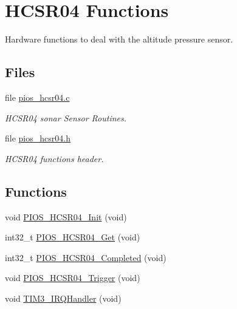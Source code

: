 \hypertarget{group___p_i_o_s___h_c_s_r04}{\section{\-H\-C\-S\-R04 \-Functions}
\label{group___p_i_o_s___h_c_s_r04}
}


\-Hardware functions to deal with the altitude pressure sensor.  


\subsection*{\-Files}
\begin{DoxyCompactItemize}
\item 
file \hyperlink{pios__hcsr04_8c}{pios\-\_\-hcsr04.\-c}
\begin{DoxyCompactList}\small\item\em \-H\-C\-S\-R04 sonar \-Sensor \-Routines. \end{DoxyCompactList}\item 
file \hyperlink{pios__hcsr04_8h}{pios\-\_\-hcsr04.\-h}
\begin{DoxyCompactList}\small\item\em \-H\-C\-S\-R04 functions header. \end{DoxyCompactList}\end{DoxyCompactItemize}
\subsection*{\-Functions}
\begin{DoxyCompactItemize}
\item 
void \hyperlink{group___p_i_o_s___h_c_s_r04_gadd605086bb317a5093f1c878fe8146a8}{\-P\-I\-O\-S\-\_\-\-H\-C\-S\-R04\-\_\-\-Init} (void)
\item 
int32\-\_\-t \hyperlink{group___p_i_o_s___h_c_s_r04_gabca094544c40eb0df7c60891621a3de2}{\-P\-I\-O\-S\-\_\-\-H\-C\-S\-R04\-\_\-\-Get} (void)
\item 
int32\-\_\-t \hyperlink{group___p_i_o_s___h_c_s_r04_ga4111a059ae6226a31ac69e550e1bc18a}{\-P\-I\-O\-S\-\_\-\-H\-C\-S\-R04\-\_\-\-Completed} (void)
\item 
void \hyperlink{group___p_i_o_s___h_c_s_r04_gae1007c4b9e7a241dcc263f00671f7f4e}{\-P\-I\-O\-S\-\_\-\-H\-C\-S\-R04\-\_\-\-Trigger} (void)
\item 
void \hyperlink{group___p_i_o_s___h_c_s_r04_gac8e51d2183b5230cbd5481f8867adce9}{\-T\-I\-M3\-\_\-\-I\-R\-Q\-Handler} (void)
\end{DoxyCompactItemize}


